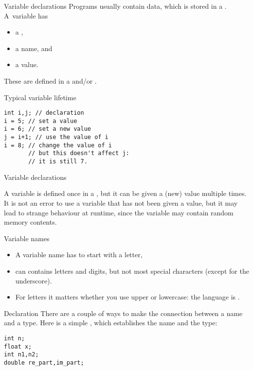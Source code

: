 \begin{slide}{Variable declarations}
  \label{sl:declaration}
  Programs usually contain data, which is stored in a
  . A~variable has
  \begin{itemize}
  \item a ,
  \item a name, and
  \item a value.
  \end{itemize}
  These are defined in a  and/or
  .
\end{slide}

\begin{block}{Typical variable lifetime}
  \label{sl:varlife}
\begin{verbatim}
int i,j; // declaration
i = 5; // set a value
i = 6; // set a new value
j = i+1; // use the value of i
i = 8; // change the value of i
       // but this doesn't affect j:
       // it is still 7.
\end{verbatim}
\end{block}

 {Variable declarations}

A variable is defined once
in a ,
but it can be given a (new) value multiple
times. It is not an error to use a variable that has not been given a
value, but it may lead to strange behaviour at runtime, since the
variable may contain random memory contents.

\begin{block}{Variable names}
  \label{sl:varname}
  \begin{itemize}
  \item
    A variable name has to start with a letter,
  \item can contains letters and  digits, but not most
    special characters (except for the underscore).
  \item For letters it matters
    whether you use upper or lowercase: the language is .
  \end{itemize}
\end{block}

\begin{block}{Declaration}
  \label{sl:declare-example}
  There are a couple of ways to make the connection between a name and a
  type. Here is a simple
  , which establishes the name
  and the type:
\begin{verbatim}
int n;
float x;
int n1,n2;
double re_part,im_part;
\end{verbatim}
\end{block}

